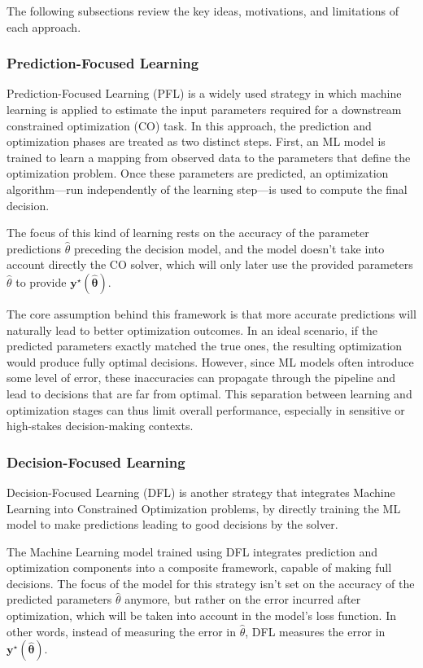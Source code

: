 The following subsections review the key ideas, motivations, and limitations of each approach.

\subsubsection{Prediction-Focused Learning}

Prediction-Focused Learning (PFL) is a widely used strategy in which machine learning is applied to estimate the input parameters required for a downstream constrained optimization (CO) task. In this approach, the prediction and optimization phases are treated as two distinct steps. First, an ML model is trained to learn a mapping from observed data to the parameters that define the optimization problem. Once these parameters are predicted, an optimization algorithm—run independently of the learning step—is used to compute the final decision.

The focus of this kind of learning rests on the accuracy of the parameter predictions \(\hat{\theta}\) preceding the decision model, and the model doesn't take into account directly the CO solver, which will only later use the provided parameters \(\hat{\theta}\) to provide \(\mathbf{y}^\star(\mathbf{\hat{\theta}})\).

The core assumption behind this framework is that more accurate predictions will naturally lead to better optimization outcomes. In an ideal scenario, if the predicted parameters exactly matched the true ones, the resulting optimization would produce fully optimal decisions. However, since ML models often introduce some level of error, these inaccuracies can propagate through the pipeline and lead to decisions that are far from optimal. This separation between learning and optimization stages can thus limit overall performance, especially in sensitive or high-stakes decision-making contexts.

\subsubsection{Decision-Focused Learning}

Decision-Focused Learning (DFL) is another strategy that integrates Machine Learning into Constrained Optimization problems, by directly training the ML model to make predictions leading to good decisions by the solver.

The Machine Learning model trained using DFL integrates prediction and optimization components into a composite framework, capable of making full decisions. The focus of the model for this strategy isn't set on the accuracy of the predicted parameters \(\hat{\theta}\) anymore, but rather on the error incurred after optimization, which will be taken into account in the model's loss function. In other words, instead of measuring the error in \(\hat{\theta}\), DFL measures the error in \(\mathbf{y}^\star(\mathbf{\hat{\theta}})\).

